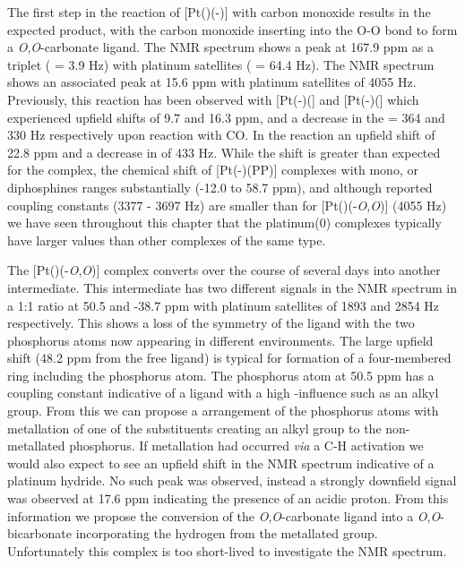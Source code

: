 The first step in the reaction of [Pt(\tButhixantphos)(-)] with carbon monoxide results in the expected product, with the carbon monoxide inserting into the O-O bond to form a \emph{O},\emph{O}-carbonate ligand.  The \carbon{} NMR spectrum shows a peak at 167.9 ppm as a triplet (\JPC{} = 3.9 Hz) with platinum satellites (\JPtC{} = 64.4 Hz).  The \phosphorus{} NMR spectrum shows an associated peak at 15.6 ppm with platinum satellites of 4055 Hz.  Previously, this reaction has been observed with [Pt(-)(] and [Pt(-)(] which experienced upfield shifts of 9.7 and 16.3 ppm, and a decrease in the \JPtP{} = 364 and 330 Hz respectively upon reaction with CO.\cite{Goel1983b}  In the \tButhixantphos{} reaction an upfield shift of 22.8 ppm and a decrease in \JPtP{} of 433 Hz.  While the shift is greater than expected for the \tButhixantphos{} complex, the chemical shift of [Pt(-)(PP)] complexes with mono, or diphosphines ranges substantially (-12.0 to 58.7 ppm), and although reported coupling constants (3377 - 3697 Hz)\cite{Goel1983b, Pregosin2012} are smaller than for [Pt(\tButhixantphos)(-\emph{O},\emph{O})] (4055 Hz) we have seen throughout this chapter that the \tBuxantphos{} platinum(0) complexes typically have larger \JPtP{} values than other complexes of the same type.

The [Pt(\tButhixantphos)(-\emph{O},\emph{O})] complex converts over the course of several days into another intermediate.  This intermediate has two different signals in the \phosphorus{} NMR spectrum  in a 1:1 ratio at 50.5 and -38.7 ppm with platinum satellites of 1893 and 2854 Hz respectively.  This shows a loss of the symmetry of the \tButhixantphos{} ligand with the two phosphorus atoms now appearing in different environments.  The large upfield shift (48.2 ppm from the free ligand) is typical  for formation of a four-membered ring including the phosphorus atom.\cite{Garrou1981}  The phosphorus atom at 50.5 ppm has a coupling constant indicative of a \trans{} ligand with a high \trans{}-influence such as an alkyl group.  From this we can propose a \cis{} arrangement of the phosphorus atoms with metallation of one of the \tBu{} substituents creating an alkyl group \trans{} to the non-metallated phosphorus.  If metallation had occurred \emph{via} a C-H activation we would also expect to see an upfield shift in the \proton{} NMR spectrum indicative of a platinum hydride.  No such peak was observed, instead a strongly downfield \proton{} signal was observed at 17.6 ppm indicating the presence of an acidic proton.  From this information we propose the conversion of the \emph{O},\emph{O}-carbonate ligand into a \emph{O},\emph{O}-bicarbonate incorporating the hydrogen from the metallated \tBu{} group.  Unfortunately this complex is too short-lived to investigate the \carbon{} NMR spectrum.

